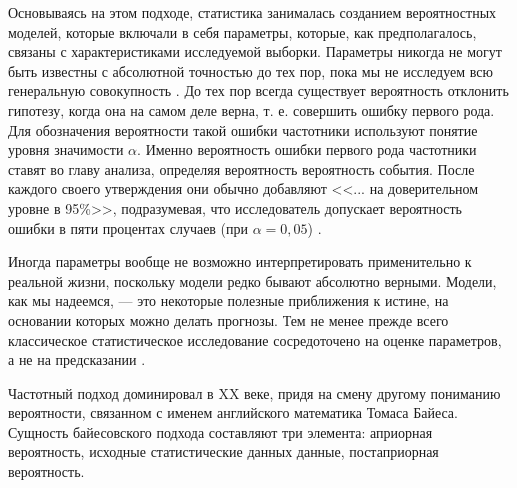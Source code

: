 Основываясь на этом подходе, статистика занималась созданием вероятностных моделей, которые включали в себя параметры, которые, как предполагалось, связаны с характеристиками исследуемой выборки. Параметры никогда не могут быть известны с абсолютной точностью до тех пор, пока мы не исследуем всю генеральную совокупность \cite[стр. 1]{Christensen2010}. До тех пор всегда существует вероятность отклонить гипотезу, когда она на самом деле верна, т. е. совершить ошибку первого рода. Для обозначения вероятности такой ошибки частотники используют понятие уровня значимости $\alpha$. Именно вероятность ошибки первого рода частотники ставят во главу анализа, определяя вероятность вероятность события. После каждого своего утверждения они обычно добавляют <<... на доверительном уровне в 95\%>>, подразумевая, что исследователь допускает вероятность ошибки в пяти процентах случаев (при $\alpha = 0,05$) \cite[стр. 10-11]{handbook_stat_dm}.

Иногда параметры вообще не возможно интерпретировать применительно к реальной жизни, поскольку модели редко бывают абсолютно верными. Модели, как мы надеемся, --- это некоторые полезные приближения к истине, на основании которых можно делать прогнозы. Тем не менее прежде всего классическое статистическое исследование  сосредоточено на оценке параметров, а не на предсказании \cite[стр. 1]{Christensen2010}.


Частотный подход доминировал в XX веке, придя на смену другому пониманию вероятности, связанном с именем английского математика Томаса Байеса\cite[стр. 2]{Efron2005}. Сущность байесовского подхода составляют три элемента: априорная вероятность, исходные статистические данных данные, постаприорная вероятность.

